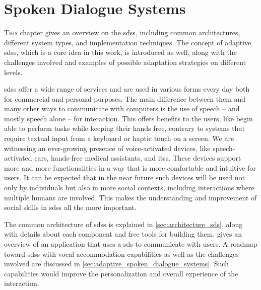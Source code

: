 \chapter{Spoken Dialogue Systems}
\label{chap:spoken_dialogue_systems}

\lettrine{T}{his} chapter gives an overview on the \aclp{sds}, including common architectures, different system types, and implementation techniques.
The concept of adaptive \aclp{sds}, which is a core idea in this work, is introduced as well, along with the challenges involved and examples of possible adaptation strategies on different levels.

\pagebreak

\acresetall


\noindent
\Acfp{sds} offer a wide range of services and are used in various forms every day both for commercial and personal purposes.
The main difference between them and many other ways to communicate with computers is the use of speech -- and mostly speech alone -- for interaction.
This offers benefits to the users, like begin able to perform tasks while keeping their hands free, contrary to systems that require textual input from a keyboard or haptic touch on a screen.
We are witnessing an ever-growing presence of voice-activated devices, like speech-activated cars, hands-free medical assistants, and \acp{its}.
These devices support more and more functionalities in a way that is more comfortable and intuitive for users.
It can be expected that in the near future such devices will be used not only by individuals but also in more social contexts, including interactions where multiple humans are involved.
This makes the understanding and improvement of social skills in \acp{sds} all the more important.

The common architecture of \acp{sds} is explained in \cref{sec:architecture_sds}, along with details about each component and free tools for building them.
 gives an overview of an application that uses a \ac{sds} to communicate with users.
A roadmap toward \acp{sds} with vocal accommodation capabilities as well as the challenges involved are discussed in \cref{sec:adaptive_spoken_dialogue_systems}.
Such capabilities would improve the personalization and overall experience of the interaction.


